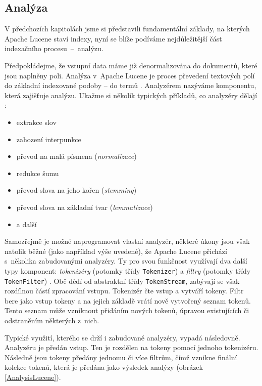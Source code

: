 \documentclass[11pt,oneside]{fithesis2}
\begin{document}
\subsection{Analýza}
V předchozích kapitolách jsme si představili fundamentální základy, na kterých Apache Lucene staví indexy, nyní se blíže podíváme nejdůležitější část indexačního procesu~--~analýzu.

Předpokládejme, že vstupní data máme již denormalizována do dokumentů, které jsou naplněny poli. Analýza v~Apache Lucene je proces převedení textových polí do základní indexované podoby -- do termů \cite[s.~28]{LuceneAction}. Analyzérem nazýváme komponentu, která zajišťuje analýzu. Ukažme si několik typických příkladů, co analyzéry dělají  \cite[s.~110]{LuceneAction}:

\begin{itemize}
	\item extrakce slov
	\item zahození interpunkce
	\item převod na malá písmena (\emph{normalizace})
	\item redukce šumu
	\item převod slova na jeho kořen (\emph{stemming})
	\item převod slova na základní tvar (\emph{lemmatizace})
	\item a další 
\end{itemize}

Samozřejmě je možné naprogramovat vlastní analyzér, některé úkony jsou však natolik běžné (jako například výše uvedené), že Apache Lucene přichází s~několika zabudovanými analyzéry. Ty pro svou funkčnost využívají dva další typy komponent: \emph{tokenizéry} (potomky třídy \texttt{Tokenizer}) a \emph{filtry} (potomky třídy \texttt{TokenFilter})  \cite[s.~115]{LuceneAction}. Obě dědí od abstraktní třídy \texttt{TokenStream}, zabývají se však rozdílnou částí zpracování vstupu. Tokenizér čte vstup a vytváří tokeny. Filtr bere jako vstup tokeny a na jejich základě vrátí nově vytvořený seznam tokenů. Tento seznam může vzniknout přidáním nových tokenů, úpravou existujících či odstraněním některých z~nich. 

Typické využití, kterého se drží i zabudované analyzéry, vypadá následovně. Analyzéru je předán vstup. Ten je rozdělen na tokeny pomocí jednoho tokenizéru. Následně jsou tokeny předány jednomu či více filtrům, čímž vznikne finální kolekce tokenů, která je předána jako výsledek analýzy (obrázek \ref{AnalysisLucene}).
\end{document}
